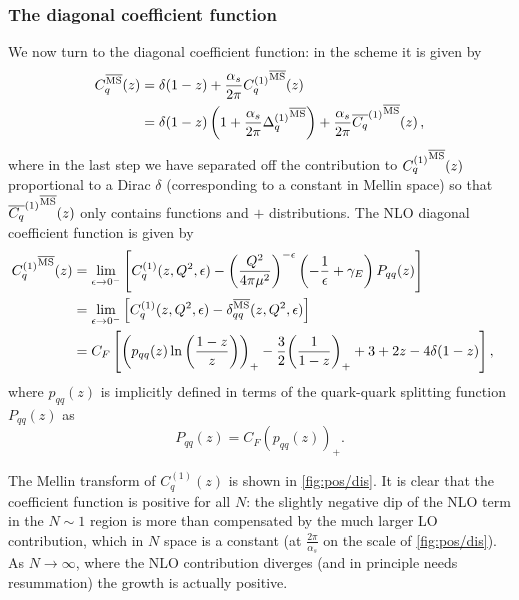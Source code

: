 \subsubsection{The diagonal coefficient function}
\label{sec:pos/diag}
We now turn to the diagonal coefficient function: in the \msbar{} scheme
it is given by
\begin{align}\label{eq:pos/cq}
  C_q^{{\overline{\textrm{MS}}}}(z)&=\delta(1-z)+ \frac{\alpha_s}{2\pi}
  {C^{(1)}_q}^{{\overline{\textrm{MS}}}}(z)\\
    &=\delta(1-z) \left(1+\frac{\alpha_s}{2\pi} {\Delta^{(1)}_q}^{{\overline{\textrm{MS}}}}\right)
  +\frac{\alpha_s}{2\pi}  {\overline{C_{q}}^{(1)}}^{{\overline{\textrm{MS}}}}(z) \,,\label{eq:pos/cqnodist}
\end{align}
where in the last step we have separated off the contribution to
$ {C^{(1)}_q}^{{\overline{\textrm{MS}}}}(z)$ proportional to a Dirac $\delta$
(corresponding to a constant in Mellin space) so that
${\overline{C_{q}}^{(1)}}^{{\overline{\textrm{MS}}}}(z)$ only contains  functions and
$+$ distributions.
The NLO diagonal coefficient function is given by
\begin{align}
\hspace*{-1em}{C^{(1)}_q}^{{\overline{\textrm{MS}}}}(z)&=
\lim_{\epsilon\to
  0^-}\left[C_{q}^{(1)}(z,Q^2,\epsilon) - \left(\frac{Q^2}{4\pi
      \mu^2}\right)^{-\epsilon} \left(-\frac 1
    {\epsilon}+\gamma_E\right) P_{qq}(z)\right]\label{eq:pos/cqren}\\
&=\lim_{\epsilon\to0^-}\left[ {C_q^{(1)}}(z,Q^2,\epsilon)
    -\delta_{qq}^{{\overline{\textrm{MS}}}}(z,Q^2,\epsilon)\right]\label{eq:pos/renormq}\\
&= C_F\left[ \left(p_{qq}(z)
    \ln\left(\frac{1-z}{z}\right) \right)_+ - \frac {3}{2}{ \left( \frac{1}{1-z} \right)_+ } + 3
    + 2 z - 4 \delta(1-z)\right]\label{eq:pos/cqnlo},
\end{align}
where 
$p_{qq}(z)$ is implicitly defined in terms of the quark-quark
splitting function $P_{qq}(z)$ as
\begin{equation}\label{eq:pos/pqq}
  P_{qq}(z)= C_F\left(p_{qq}(z)\right)_+.
\end{equation}


The Mellin transform of $C^{(1)}_q(z)$ is shown in
\cref{fig:pos/dis}. It is clear that the coefficient function is
positive for all $N$: the slightly negative dip of the NLO term
in the $N\sim 1$
region is more than compensated by the much larger LO contribution,
which in $N$ space is a constant (at $\frac{2 \pi}{\alpha_s}$ on the
scale of \cref{fig:pos/dis}). 
As $N\to\infty$, where the NLO contribution diverges (and in
principle needs resummation) the growth is actually positive.

